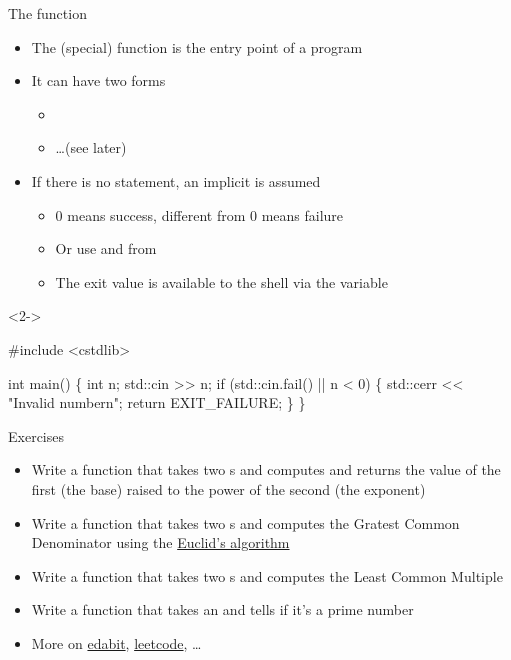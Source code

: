 \begin{frame}[fragile]{The  function}
  \begin{itemize}
  \item The  (special) function is the entry point of a program
  \item It can have two forms
    \begin{itemize}
    \item {}
    \item \ldots (see later)
    \end{itemize}
  \item If there is no  statement, an implicit  is assumed
    \begin{itemize}
    \item $0$ means success, different from $0$ means failure
    \item Or use  and  from 
    \item The exit value is available to the shell via the  variable
    \end{itemize}
  \end{itemize}

  \begin{codeblock}<2->{
#include <cstdlib>

int main()
\{
  int n;
  std::cin >{}> n;
  if (std::cin.fail() || n < 0) \{
    std::cerr << "Invalid number\bslash{}n";
    return EXIT_FAILURE;
  \}
  \ddd
\}}\end{codeblock}

\end{frame}

\begin{frame}{Exercises}
  \begin{itemize}
  \item Write a function  that takes two s and computes and
    returns the value of the first (the base) raised to the power of the second
    (the exponent)
  \item Write a function  that takes two s and computes the
    Gratest Common Denominator using the
    \href{https://en.wikipedia.org/wiki/Euclidean_algorithm}{Euclid's algorithm}
  \item Write a function  that takes two s and computes the
    Least Common Multiple
  \item Write a function  that takes an  and tells if
    it's a prime number
  \item More on \href{https://edabit.com/}{edabit}, \href{https://leetcode.com/}{leetcode}, \ldots
  \end{itemize}

\end{frame}


